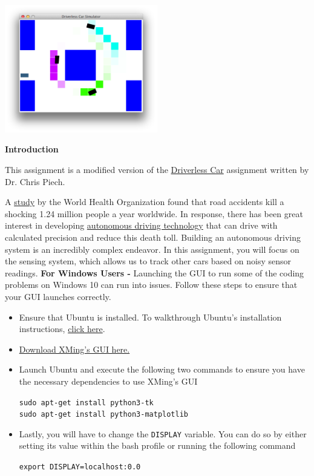 
\begin{center}
\includegraphics[width=0.5\textwidth]{media/car3.png}
\end{center}

{\bf Introduction}

This assignment is a modified version of the
\href{http://stanford.edu/~cpiech/cs221/homework/prog/driverlessCar/driverlessCar.html}
{Driverless Car} assignment written by Dr. Chris Piech.

A \href{http://en.mercopress.com/2013/03/18/in-2010-there-were-1.24-million-road-traffic-related-deaths-worldwide-says-who-report}
{study} by the World Health Organization found that road accidents kill a
shocking 1.24 million people a year worldwide. In response, there has been great
interest in developing \href{https://en.wikipedia.org/wiki/Autonomous_car}
{autonomous driving technology} that can drive with calculated precision and
reduce this death toll. Building an autonomous driving system is an incredibly
complex endeavor. In this assignment, you will focus on the sensing system,
which allows us to track other cars based on noisy sensor readings.
\clearpage
\textbf{For Windows Users -} Launching the GUI to run some of the coding problems on Windows 10 can run into issues. Follow these steps
to ensure that your GUI launches correctly.
\begin{itemize}
  \item Ensure that Ubuntu is installed. To walkthrough Ubuntu's installation instructions, \href{https://ubuntu.com/tutorials/ubuntu-on-windows}{click here}.
  \item \href{https://sourceforge.net/projects/xming/}{Download XMing's GUI here.}
  \item Launch Ubuntu and execute the following two commands to ensure you have the necessary dependencies to use XMing's GUI \\
  \begin{center}
    \texttt{sudo apt-get install python3-tk}\\
    \texttt{sudo apt-get install python3-matplotlib}\\
  \end{center}
  \item Lastly, you will have to change the \texttt{DISPLAY} variable. You can do so by either setting its value within the bash profile or running the following command
  \begin{center}
    \texttt{export DISPLAY=localhost:0.0}
  \end{center}
\end{itemize}
\clearpage

